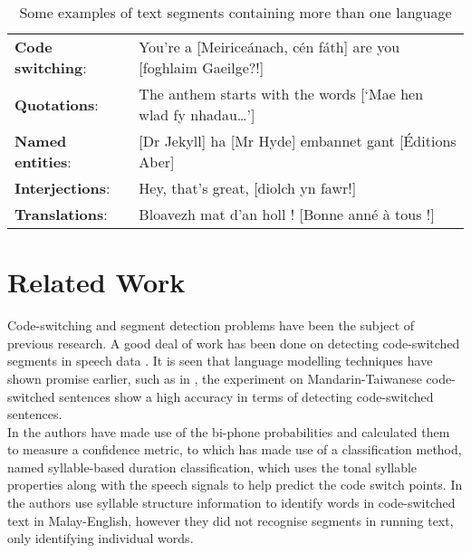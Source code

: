 \documentclass[11pt]{article}
\begin{document}
\begin{table}[h]
\begin{center}
\begin{tabular}{ll}
 \textbf{Code switching}: & You're a [Meirice\'{a}nach, c\'{e}n f\'{a}th] are you [foghlaim Gaeilge?!] \\
\textbf{Quotations}: & The anthem starts with the words [`Mae hen wlad fy nhadau\ldots'] \\
 \textbf{Named entities}: & [Dr Jekyll] ha [Mr Hyde] embannet gant [\'{E}ditions Aber] \\
 \textbf{Interjections}: & Hey, that's great, [diolch yn fawr!] \\
 \textbf{Translations}: & Bloavezh mat d'an holl ! [Bonne ann\'{e} \`{a} tous !] \\
\end{tabular}
\caption{Some examples of text segments containing more than one language}
\label{table:examples}
\end{center}
\end{table}


\section{Related Work}
\label{sec:relwork}

Code-switching and segment detection problems have been the subject of previous research. A good deal of work
has been done on detecting code-switched segments in speech data \cite{chan2004detection,lyu2006language}.
It is seen that language modelling techniques have shown promise earlier, such as in , 
the experiment on Mandarin-Taiwanese code-switched sentences show a high accuracy in terms of detecting code-switched sentences. \\

In  the authors have made use of the bi-phone probabilities and calculated them to measure a confidence metric, 
to \cite{lyu2006language} which has made use of a classification method, named syllable-based duration classification, 
which uses the tonal syllable properties along with the speech signals to help predict the code switch points. In  
 the authors use syllable structure information to identify words in code-switched text in Malay-English, however they did not 
recognise segments in running text, only identifying individual words.

\end{document}
